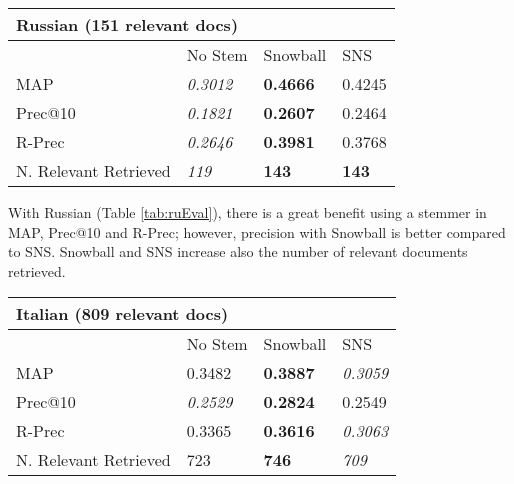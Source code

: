 \begin{center}
   \begin{tabular}{| l | l | l | l |}
    \hline
    \multicolumn{4}{|l|}{\textbf{Russian (151 relevant docs)}}\\ \hline
    & No Stem & Snowball & SNS\\ \hline
    MAP & \textit{0.3012} & \textbf{0.4666} & 0.4245 \\ \hline
    Prec@10 & \textit{0.1821} & \textbf{0.2607}  & 0.2464 \\ \hline
    R-Prec & \textit{0.2646} & \textbf{0.3981} & 0.3768\\ \hline
    N. Relevant Retrieved & \textit{119} & \textbf{143} & \textbf{143}\\ \hline    
    \end{tabular}
    \label{tab:ruEval}
\end{center}

With Russian (Table \ref{tab:ruEval}), there is a great benefit using a stemmer in MAP, Prec@10 and R-Prec; however, precision with Snowball is better compared to SNS. Snowball and SNS increase also the number of relevant documents retrieved. 

\begin{center}
   \begin{tabular}{| l | l | l | l |}
    \hline
    \multicolumn{4}{|l|}{\textbf{Italian (809 relevant docs)}}\\ \hline
    & No Stem & Snowball & SNS\\ \hline
    MAP & 0.3482 & \textbf{0.3887} & \textit{0.3059} \\ \hline
    Prec@10 & \textit{0.2529} & \textbf{0.2824} & 0.2549 \\ \hline
    R-Prec & 0.3365 & \textbf{0.3616} & \textit{0.3063}\\ \hline
	N. Relevant Retrieved & 723 & \textbf{746} & \textit{709}\\ \hline        
    \end{tabular}
    \label{tab:itEval}
\end{center}

